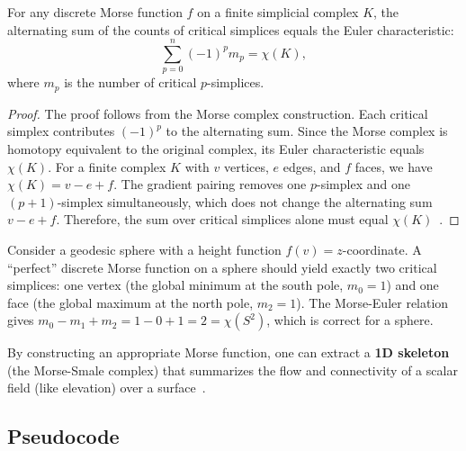 \begin{theorem}\label{thm:morse_euler}
For any discrete Morse function $f$ on a finite simplicial complex $K$, the alternating sum of the counts of critical simplices equals the Euler characteristic:
\[
\sum_{p=0}^{n} (-1)^p m_p = \chi(K),
\]
where $m_p$ is the number of critical $p$-simplices.
\end{theorem}

\begin{proof}
The proof follows from the Morse complex construction. Each critical simplex contributes $(-1)^p$ to the alternating sum. Since the Morse complex is homotopy equivalent to the original complex, its Euler characteristic equals $\chi(K)$. For a finite complex $K$ with $v$ vertices, $e$ edges, and $f$ faces, we have $\chi(K) = v - e + f$. The gradient pairing removes one $p$-simplex and one $(p+1)$-simplex simultaneously, which does not change the alternating sum $v - e + f$. Therefore, the sum over critical simplices alone must equal $\chi(K)$~\cite{forman2002}.
\end{proof}

\begin{example}\label{ex:morse_sphere}
Consider a geodesic sphere with a height function $f(v) = z$-coordinate. A ``perfect'' discrete Morse function on a sphere should yield exactly two critical simplices: one vertex (the global minimum at the south pole, $m_0 = 1$) and one face (the global maximum at the north pole, $m_2 = 1$). The Morse-Euler relation gives $m_0 - m_1 + m_2 = 1 - 0 + 1 = 2 = \chi(S^2)$, which is correct for a sphere.
\end{example}

By constructing an appropriate Morse function, one can extract a \textbf{1D skeleton} (the Morse-Smale complex) that summarizes the flow and connectivity of a scalar field (like elevation) over a surface~\cite{gyulassy2008}.

\subsection{Pseudocode}

